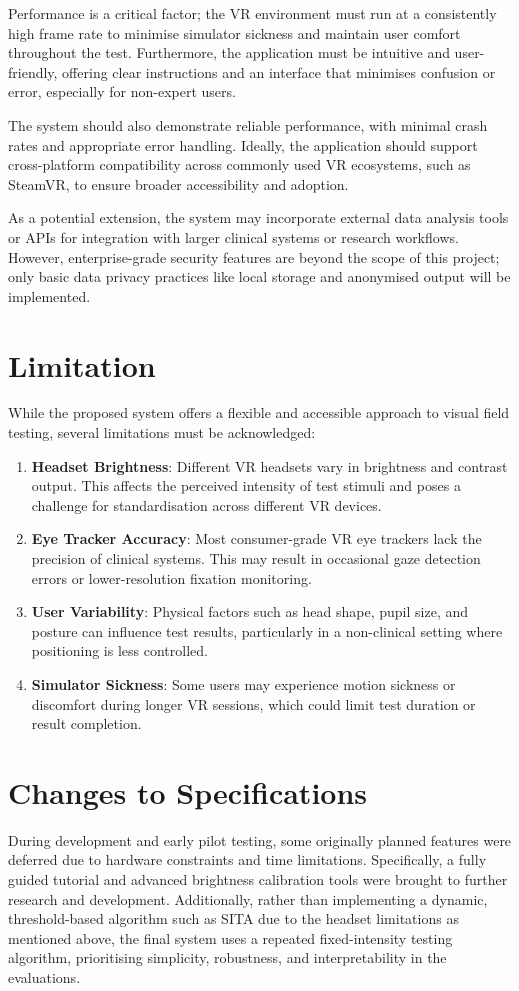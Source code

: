 \documentclass{l4proj}
\begin{document}
Performance is a critical factor; the VR environment must run at a consistently high frame rate to minimise simulator sickness and maintain user comfort throughout the test. Furthermore, the application must be intuitive and user-friendly, offering clear instructions and an interface that minimises confusion or error, especially for non-expert users.

The system should also demonstrate reliable performance, with minimal crash rates and appropriate error handling. Ideally, the application should support cross-platform compatibility across commonly used VR ecosystems, such as SteamVR, to ensure broader accessibility and adoption.

As a potential extension, the system may incorporate external data analysis tools or APIs for integration with larger clinical systems or research workflows. However, enterprise-grade security features are beyond the scope of this project; only basic data privacy practices like local storage and anonymised output will be implemented.

\section{Limitation}
While the proposed system offers a flexible and accessible approach to visual field testing, several limitations must be acknowledged:

\begin{enumerate}
    \item \textbf{Headset Brightness}: Different VR headsets vary in brightness and contrast output. This affects the perceived intensity of test stimuli and poses a challenge for standardisation across different VR devices.
    \item \textbf{Eye Tracker Accuracy}: Most consumer-grade VR eye trackers lack the precision of clinical systems. This may result in occasional gaze detection errors or lower-resolution fixation monitoring.
    \item \textbf{User Variability}: Physical factors such as head shape, pupil size, and posture can influence test results, particularly in a non-clinical setting where positioning is less controlled.
    \item \textbf{Simulator Sickness}: Some users may experience motion sickness or discomfort during longer VR sessions, which could limit test duration or result completion.
\end{enumerate}

\section{Changes to Specifications}
During development and early pilot testing, some originally planned features were deferred due to hardware constraints and time limitations. Specifically, a fully guided tutorial and advanced brightness calibration tools were brought to further research and development. Additionally, rather than implementing a dynamic, threshold-based algorithm such as SITA due to the headset limitations as mentioned above, the final system uses a repeated fixed-intensity testing algorithm, prioritising simplicity, robustness, and interpretability in the evaluations.
\end{document}
